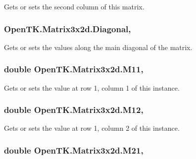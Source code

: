 Gets or sets the second column of this matrix. 

\hypertarget{struct_open_t_k_1_1_matrix3x2d_a058d205a9f8cd389ae9d98453598ee86}{
\subsubsection[{Diagonal}]{ Open\-T\-K.\-Matrix3x2d.\-Diagonal\hspace{0.3cm}{\ttfamily [get]}, {\ttfamily [set]}}}\label{struct_open_t_k_1_1_matrix3x2d_a058d205a9f8cd389ae9d98453598ee86}


Gets or sets the values along the main diagonal of the matrix. 

\hypertarget{struct_open_t_k_1_1_matrix3x2d_a23c85bab41da21113dc4977fdcfd8407}{
\subsubsection[{M11}]{\setlength{\rightskip}{0pt plus 5cm}double Open\-T\-K.\-Matrix3x2d.\-M11\hspace{0.3cm}{\ttfamily [get]}, {\ttfamily [set]}}}\label{struct_open_t_k_1_1_matrix3x2d_a23c85bab41da21113dc4977fdcfd8407}


Gets or sets the value at row 1, column 1 of this instance. 

\hypertarget{struct_open_t_k_1_1_matrix3x2d_a5c9e919dc563cc5fc6768c449d75382d}{
\subsubsection[{M12}]{\setlength{\rightskip}{0pt plus 5cm}double Open\-T\-K.\-Matrix3x2d.\-M12\hspace{0.3cm}{\ttfamily [get]}, {\ttfamily [set]}}}\label{struct_open_t_k_1_1_matrix3x2d_a5c9e919dc563cc5fc6768c449d75382d}


Gets or sets the value at row 1, column 2 of this instance. 

\hypertarget{struct_open_t_k_1_1_matrix3x2d_a2c24f8339241e5b8302ba4ecdb2e7a7d}{
\subsubsection[{M21}]{\setlength{\rightskip}{0pt plus 5cm}double Open\-T\-K.\-Matrix3x2d.\-M21\hspace{0.3cm}{\ttfamily [get]}, {\ttfamily [set]}}}\label{struct_open_t_k_1_1_matrix3x2d_a2c24f8339241e5b8302ba4ecdb2e7a7d}


